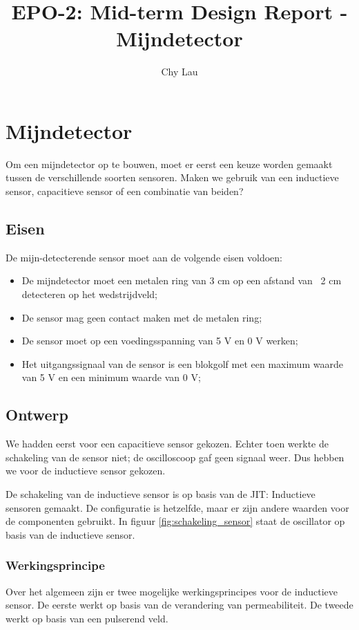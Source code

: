 \documentclass{report}
\title{EPO-2: Mid-term Design Report - Mijndetector}
\author{Chy Lau}
\begin{document}
\chapter{Mijndetector}
\label{ch:mijn}
Om een mijndetector op te bouwen, moet er eerst een keuze worden gemaakt tussen de verschillende soorten sensoren. Maken we gebruik van een inductieve sensor, capacitieve sensor of een combinatie van beiden?

\section{Eisen}
\label{sec:eisen}
De mijn-detecterende sensor moet aan de volgende eisen voldoen: 
\begin{itemize}
\item De mijndetector moet een metalen ring van 3 cm \diameter op een afstand van ~2 cm detecteren op het wedstrijdveld;
\item De sensor mag geen contact maken met de metalen ring;
\item De sensor moet op een voedingsspanning van 5 V en 0 V werken;
\item Het uitgangssignaal van de sensor is een blokgolf met een maximum waarde van 5 V en een minimum waarde van 0 V;
\end{itemize}

\section{Ontwerp}
\label{sec:ontwerp}
We hadden eerst voor een capacitieve sensor gekozen. Echter toen werkte de schakeling van de sensor niet; de oscilloscoop gaf geen signaal weer. Dus hebben we voor de inductieve sensor gekozen.

De schakeling van de inductieve sensor is op basis van de JIT: Inductieve sensoren gemaakt. De configuratie is hetzelfde, maar er zijn andere waarden voor de componenten gebruikt. In figuur \ref{fig:schakeling_sensor} staat de oscillator op basis van de inductieve sensor.

\subsection{Werkingsprincipe}
\label{ssec:werking}
Over het algemeen zijn er twee mogelijke werkingsprincipes voor de inductieve sensor. De eerste werkt op basis van de verandering van permeabiliteit. De tweede werkt op basis van een pulserend veld. 
\end{document}
